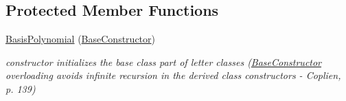 \subsection*{Protected Member Functions}
\begin{DoxyCompactItemize}
\item 
\hyperlink{classPecos_1_1BasisPolynomial_a483dd35abaf764ce50b3c807390be280}{Basis\+Polynomial} (\hyperlink{structPecos_1_1BaseConstructor}{Base\+Constructor})
\begin{DoxyCompactList}\small\item\em constructor initializes the base class part of letter classes (\hyperlink{structPecos_1_1BaseConstructor}{Base\+Constructor} overloading avoids infinite recursion in the derived class constructors -\/ Coplien, p. 139) \end{DoxyCompactList}\end{DoxyCompactItemize}
